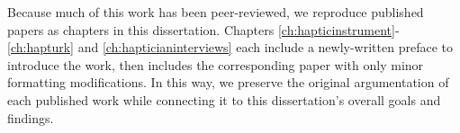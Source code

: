 \noindent
Because much of this work has been peer-reviewed, we reproduce published papers as chapters in this dissertation.
Chapters \ref{ch:hapticinstrument}-\ref{ch:hapturk} and \ref{ch:hapticianinterviews} each include a newly-written preface to introduce the work, then includes the corresponding paper with only minor formatting modifications.
In this way, we preserve the original argumentation of each published work while connecting it to this dissertation's overall goals and findings.




%
%
%	
%

